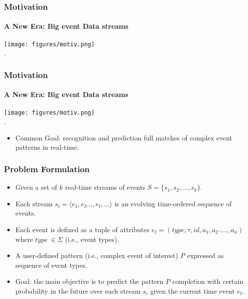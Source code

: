 



\frame
{
	\frametitle{Motivation}
	\framesubtitle{A New Era: Big event Data streams}
		\begin{center}
		\texttt{[image: figures/motiv.png]}\\
		.
	\end{center}
}


\frame
{
\frametitle{Motivation}
\framesubtitle{A New Era: Big event Data streams}
\begin{center}
	\texttt{[image: figures/motiv.png]}\\
	.
\end{center}
	

	\begin{itemize}[]
		
		\item<1-> Common Goal: recognition and prediction full matches of complex event patterns in real-time.
		
	\end{itemize}
}


\frame
{
	\frametitle{Problem Formulation}
	
	\begin{itemize}[]
		\item<1->Given a set of $k$ real-time streams of events $S = \{ s_1,s_2, ..., s_k\}$.
		
		\item<1 -> Each stream $s_i=\langle e_1,e_3...,e_t,...\rangle$  is an evolving time-ordered sequence of events.
		
		\item<1 -> Each event is defined as a tuple of attributes $e_t = (type,\tau,id,a_1,a_2.....,a_n)$ where $type\ \in  \Sigma$ (i.e., event types). 
		\item<1-> A user-defined pattern (i.e., complex event of interest) $P$ expressed as sequence of event types.
		
		
		\item<1->Goal: the main objective is to predict the pattern $P$ completion with certain probability in the future over each stream $s_i$ given the current time event $e_t$. 
	\end{itemize}
}


